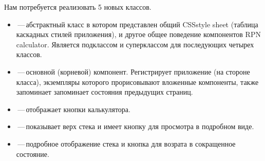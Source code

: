 \documentclass[a4paper,10pt,twoside]{book}
\begin{document}
Нам потребуется реализовать 5 новых классов.
\begin{itemize}
\item {}\,---\,абстрактный класс в котором представлен общий
CSSstyle sheet (таблица каскадных стилей приложения), и другое общее поведение компонентов RPN calculator. Является подклассом 
и суперклассом для последующих четырех классов.
  

\item {}\,---\,основной (корневой) компонент. Регистрирует
приложение (на стороне класса), экземпляры которого прорисовывают
вложенные компоненты, также запоминает запоминает состояния
предыдущих страниц.


\item {}\,---\,отображает кнопки калькулятора.


\item {}\,---\,показывает верх стека и имеет кнопку для
просмотра в подробном виде.


\item {}\,---\,подробное отображение стека и кнопка для
возрата в сокращенное состояние.
\end{itemize}



\end{document}
